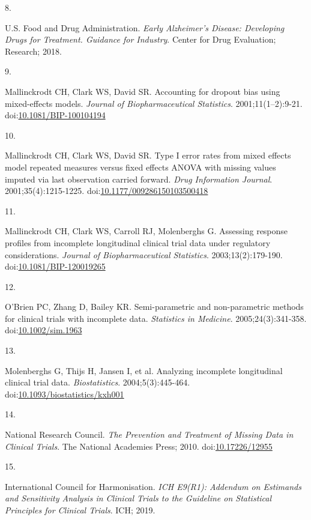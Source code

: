 \documentclass[
  11pt,
]{article}
\newlength{\cslhangindent}
\newlength{\csllabelwidth}
\newenvironment{CSLReferences}[2] %
 {\begin{list}{}{%
  \setlength{\itemindent}{0pt}
  \setlength{\leftmargin}{0pt}
  \setlength{\parsep}{0pt}
  \ifodd #1
   \setlength{\leftmargin}{\cslhangindent}
   \setlength{\itemindent}{-1\cslhangindent}
  \fi
  \setlength{\itemsep}{#2\baselineskip}}}
 {\end{list}}
\newcommand{\CSLLeftMargin}[1]{\parbox[t]{\csllabelwidth}{\strut#1\strut}}
\newcommand{\CSLRightInline}[1]{\parbox[t]{\linewidth - \csllabelwidth}{\strut#1\strut}}
\begin{document}
\begin{CSLReferences}{0}{1}
\CSLLeftMargin{8. }%
\CSLRightInline{U.S. Food and Drug Administration. \emph{Early {Alzheimer's} Disease: Developing Drugs for Treatment. Guidance for Industry}. Center for Drug Evaluation; Research; 2018.}

\CSLLeftMargin{9. }%
\CSLRightInline{Mallinckrodt CH, Clark WS, David SR. Accounting for dropout bias using mixed-effects models. \emph{Journal of Biopharmaceutical Statistics}. 2001;11(1--2):9-21. doi:\href{https://doi.org/10.1081/BIP-100104194}{10.1081/BIP-100104194}}

\CSLLeftMargin{10. }%
\CSLRightInline{Mallinckrodt CH, Clark WS, David SR. Type {I} error rates from mixed effects model repeated measures versus fixed effects {ANOVA} with missing values imputed via last observation carried forward. \emph{Drug Information Journal}. 2001;35(4):1215-1225. doi:\href{https://doi.org/10.1177/009286150103500418}{10.1177/009286150103500418}}

\CSLLeftMargin{11. }%
\CSLRightInline{Mallinckrodt CH, Clark WS, Carroll RJ, Molenberghs G. Assessing response profiles from incomplete longitudinal clinical trial data under regulatory considerations. \emph{Journal of Biopharmaceutical Statistics}. 2003;13(2):179-190. doi:\href{https://doi.org/10.1081/BIP-120019265}{10.1081/BIP-120019265}}

\CSLLeftMargin{12. }%
\CSLRightInline{O'Brien PC, Zhang D, Bailey KR. Semi-parametric and non-parametric methods for clinical trials with incomplete data. \emph{Statistics in Medicine}. 2005;24(3):341-358. doi:\href{https://doi.org/10.1002/sim.1963}{10.1002/sim.1963}}

\CSLLeftMargin{13. }%
\CSLRightInline{Molenberghs G, Thijs H, Jansen I, et al. Analyzing incomplete longitudinal clinical trial data. \emph{Biostatistics}. 2004;5(3):445-464. doi:\href{https://doi.org/10.1093/biostatistics/kxh001}{10.1093/biostatistics/kxh001}}

\CSLLeftMargin{14. }%
\CSLRightInline{National Research Council. \emph{The Prevention and Treatment of Missing Data in Clinical Trials}. The National Academies Press; 2010. doi:\href{https://doi.org/10.17226/12955}{10.17226/12955}}

\CSLLeftMargin{15. }%
\CSLRightInline{International Council for Harmonisation. \emph{{ICH E9(R1)}: Addendum on Estimands and Sensitivity Analysis in Clinical Trials to the Guideline on Statistical Principles for Clinical Trials}. ICH; 2019.}


\end{CSLReferences}
\end{document}
